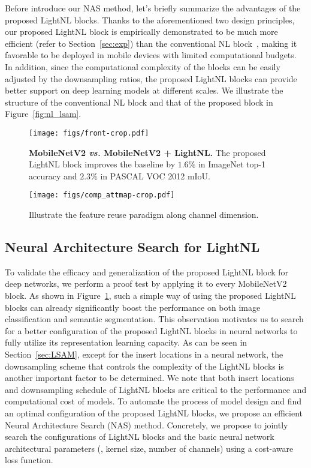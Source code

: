 \documentclass[10pt,twocolumn,letterpaper]{article}
\begin{document}
Before introduce our NAS method, let's briefly summarize the advantages of the proposed LightNL blocks. Thanks to the aforementioned two design principles, our proposed LightNL block is empirically demonstrated to be much  more  efficient (refer to Section~\ref{sec:exp}) than the conventional NL block~\cite{wang2018non}, making it favorable to be deployed in mobile devices with limited computational budgets. In addition, since the computational complexity of the blocks can be easily adjusted by the downsampling ratios, the proposed LightNL blocks can provide better support on deep learning models at different scales. We illustrate the structure of the conventional NL block and that of the proposed block in Figure~\ref{fig:nl_lsam}.

\begin{figure}[tb]
\centering
\texttt{[image: figs/front-crop.pdf]}
\caption{\textbf{MobileNetV2 \emph{vs.} MobileNetV2 + LightNL.} The proposed LightNL block improves the baseline by $1.6\%$ in ImageNet top-1 accuracy and $2.3\%$ in PASCAL VOC 2012 mIoU.}
\label{fig:clsseg}
\vspace{-1em}
\end{figure}


\begin{figure*}[tb]
\centering
\texttt{[image: figs/comp\_attmap-crop.pdf]}
\caption{Illustrate the feature reuse paradigm along channel dimension.}
\label{fig:fig3}
\vspace{-1em}
\end{figure*}


\subsection{Neural Architecture Search for LightNL}
\label{sec:search}

To validate the efficacy and generalization of the proposed LightNL block for deep networks, we perform a proof test by applying it to every MobileNetV2 block. As shown in Figure~\ref{fig:clsseg}, such a simple way of using the proposed LightNL blocks can already significantly boost the performance on both image classification and semantic segmentation. This observation motivates us to search for a better configuration of the proposed LightNL blocks in neural networks to fully utilize its representation learning capacity.
As can be seen in Section~\ref{sec:LSAM}, except for the insert locations in a neural network, the downsampling scheme that controls the complexity of the LightNL blocks is another important factor to be determined. We note that both insert locations and downsampling schedule of LightNL blocks are critical to the performance and computational cost of models. To automate the process of model design and find an optimal configuration of the proposed LightNL blocks, we propose an efficient Neural Architecture Search (NAS) method.
Concretely, 
we propose to jointly search the configurations of LightNL blocks and the basic neural network architectural parameters (\eg, kernel size, number of channels) using a cost-aware loss function.
\end{document}
